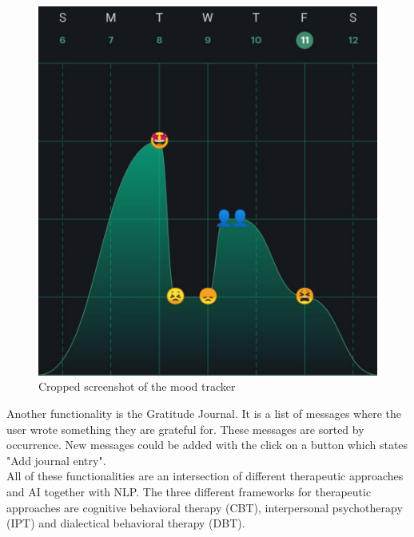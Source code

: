 \begin{figure}[ht]
  \begin{center}
    \includegraphics[width=1\columnwidth]{files/moodtracker.png}
    \caption{\label{fig:moodtracker} Cropped screenshot of the mood tracker}
  \end{center}
\end{figure}

Another functionality is the Gratitude Journal.
It is a list of messages where the user wrote something they are grateful for.
These messages are sorted by occurrence.
New messages could be added with the click on a button which states "Add journal entry".\\

All of these functionalities are an intersection of different therapeutic approaches and AI together with NLP\cite{woebot-powers}.
The three different frameworks for therapeutic approaches are cognitive behavioral therapy (CBT), interpersonal psychotherapy (IPT) and dialectical behavioral therapy (DBT).

